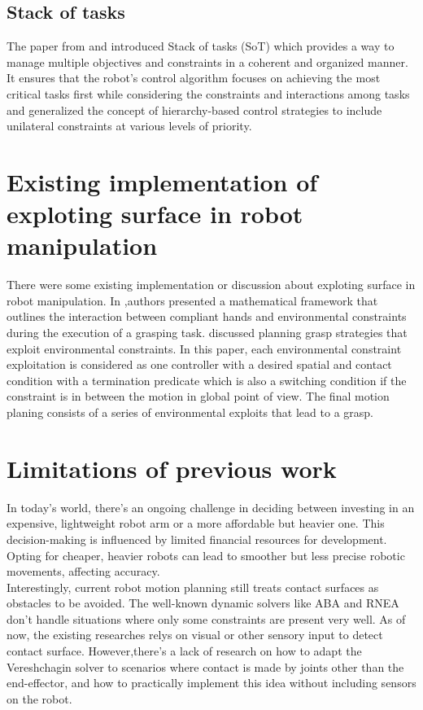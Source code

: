 \documentclass[report.tex]{subfiles}
\begin{document}
    \subsection{Stack of tasks}
    The paper from \cite{mansard2009unified} and \cite{mansard2009versatile} introduced Stack of tasks (SoT) which provides a way to manage multiple objectives and constraints in a coherent and organized manner. It ensures that the robot's control algorithm focuses on achieving the most critical tasks first while considering the constraints and interactions among tasks and generalized the concept of hierarchy-based control strategies to include unilateral constraints at various levels of priority.
    \section{Existing implementation of exploting surface in robot manipulation}\label{Existing implementation of exploting surface in robot manipulation}
    There were some existing implementation or discussion about exploting surface in robot manipulation. In \cite{salvietti2015modeling} ,authors presented a mathematical framework that outlines the interaction between compliant hands and environmental constraints during the execution of a grasping task. \cite{eppner2015planning} discussed planning grasp strategies that exploit environmental constraints. In this paper, each environmental constraint exploitation is considered as one controller with a desired spatial and contact condition with a termination predicate which is also a switching condition if the constraint is in between the motion in global point of view. The final motion planing consists of a series of environmental exploits that lead to a grasp.
    \section{Limitations of previous work}\label{Limitations of previous work}
    In today's world, there's an ongoing challenge in deciding between investing in an expensive, lightweight robot arm or a more affordable but heavier one. This decision-making is influenced by limited financial resources for development. Opting for cheaper, heavier robots can lead to smoother but less precise robotic movements, affecting accuracy.\\Interestingly, current robot motion planning still treats contact surfaces as obstacles to be avoided. The well-known dynamic solvers like ABA and RNEA don't handle situations where only some constraints are present very well. As of now, the existing researches relys on visual or other sensory input to detect contact surface. However,there's a lack of research on how to adapt the Vereshchagin solver to scenarios where contact is made by joints other than the end-effector, and how to practically implement this idea without including sensors on the robot.
\end{document}
